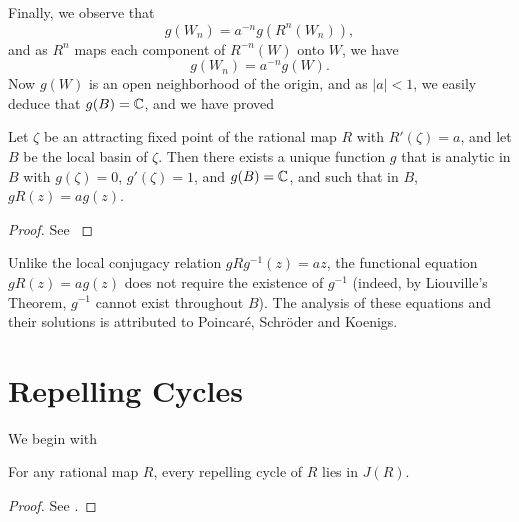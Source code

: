 Finally, we observe that
\begin{equation*}
    g(W_n) = a^{-n} g(R^n(W_n)),
\end{equation*}
and as $R^n$ maps each component of $R^{-n}(W)$ onto $W$, we have
\begin{equation*}
    g(W_n) = a^{-n} g(W).
\end{equation*}
Now $g(W)$ is an open neighborhood of the origin, and as $|a| < 1$, we easily
deduce that $g(B) = \mathbb{C}$, and we have proved

\begin{theorem}
    \label{thm:koenigs_global_linearization}
    Let $\zeta$ be an attracting fixed point of the rational map $R$ with
    $R'(\zeta) = a$, and let $B$ be the local basin of $\zeta$. Then there
    exists a unique function $g$ that is analytic in $B$ with $g(\zeta) = 0$,
    $g'(\zeta) = 1$, and $g(B) = \mathbb{C}$, and such that in $B$, $g R(z) = a g(z)$.
\end{theorem}
\begin{proof}
    See \cite[108--109]{Beardon1991}
\end{proof}

\begin{remark}
    Unlike the local conjugacy relation $g R g^{-1}(z) = az$, the functional
    equation $g R(z) = a g(z)$ does not require the existence of $g^{-1}$
    (indeed, by Liouville's Theorem, $g^{-1}$ cannot exist throughout $B$). The
    analysis of these equations and their solutions is attributed to Poincaré,
    Schröder and Koenigs.
\end{remark}

\section{Repelling Cycles}
\label{sec:repelling_cycles}

We begin with

\begin{theorem}
    \label{thm:repelling_cycles_are_in_J}
    For any rational map $R$, every repelling cycle of $R$ lies in $J(R)$.
\end{theorem}
\begin{proof}
    See \cite[109--110]{Beardon1991}.
\end{proof}

